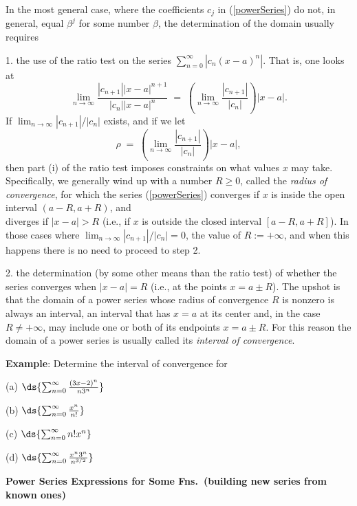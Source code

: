 \documentclass[12pt,fleqn]{article}
\begin{document}
\item
  In the most general case, where the coefficients $c_j$ in
  (\ref{powerSeries}) do not, in general, equal $\beta^j$ for some
  number $\beta$, the determination of the domain usually requires
  \bi
  \item[1.]
	the use of the ratio test on the series
	$\sum_{n=0}^\infty |c_n (x-a)^n|$.  That is, one looks at
	$$ \lim_{n\rightarrow\infty} \frac{|c_{n+1}| |x - a|^{n+1}}
	  {|c_n| |x-a|^n} \;=\; \left(\lim_{n\rightarrow\infty} \frac{|c_{n+1}|}
	  {|c_n|}\right) |x-a|. $$
	If $\lim_{n\rightarrow\infty} |c_{n+1}|/|c_n|$ exists, and if we let
	$$ \rho \;=\; \left(\lim_{n\rightarrow\infty} \frac{|c_{n+1}|}
	  {|c_n|}\right) |x-a|, $$
	then part (i) of the ratio test imposes constraints on what values
	$x$ may take.  Specifically, we generally wind up with a number
	$R \ge 0$, called the {\em radius of convergence}, for which
	the series (\ref{powerSeries})
	\bq
	  converges if $x$ is inside the open interval $(a-R, a+R)$, and \\[6pt]
	  diverges if $|x - a| > R$ (i.e., if $x$ is outside the closed
	  interval $[a-R, a+R]$).
	\eq
	In those cases where $\lim_{n\rightarrow\infty} |c_{n+1}|/|c_n| = 0$,
	the value of $R := +\infty$, and when this happens there is no need
	to proceed to step 2.

  \item[2.]
	the determination (by some other means than the ratio test) of
	whether the series converges when $|x-a| = R$ (i.e., at the points
	$x = a \pm R$).
  \ei
  The upshot is that the domain of a power series whose radius of
  convergence $R$ is nonzero is always an interval, an interval
  that has $x=a$ at its center and, in the case $R \ne +\infty$,
  may include one or both of its endpoints $x = a \pm R$.  For this
  reason the domain of a power series is usually called its
  {\em interval of convergence}.
\ei

\vs{0.2in}
\ni
{\bf Example}: Determine the interval of convergence for
\be
\item[(a)] $\ds{\sum_{n=0}^\infty \frac{(3x-2)^n}{n3^n}}$
\item[(b)] $\ds{\sum_{n=0}^\infty \frac{x^n}{n!}}$
\item[(c)] $\ds{\sum_{n=0}^\infty n! x^n}$
\item[(d)] $\ds{\sum_{n=0}^\infty \frac{x^n 3^n}{n^{3/2}}}$
\ee

\np
\ni
{\bf Power Series Expressions for Some Fns.~(building new series
from known ones)}
\end{document}
